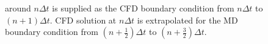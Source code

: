 \documentclass[preprint,12pt]{elsarticle}
\begin{document}
\begin{figure}
{around $n{\Delta}t$ is supplied as the CFD boundary condition
from $n{\Delta}t$ to $(n+1){\Delta}t$. CFD solution at $n{\Delta}t$ is extrapolated
for the MD boundary condition from $(n+\frac{1}{2}){\Delta}t$ to $(n+\frac{3}{2}){\Delta}t$.}
\label{Hybrid_Timescale1}
\end{figure}


\end{document}
